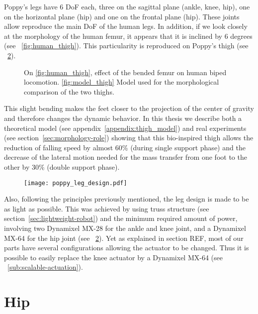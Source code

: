 Poppy's legs have 6 DoF each, three on the sagittal plane (ankle, knee, hip), one on the horizontal plane (hip) and one on the frontal plane (hip). These joints allow reproduce the main DoF of the human legs. In addition, if we look closely at the morphology of the human femur, it appears that it is inclined by 6 degrees (see \figurename~\ref{fig:human_thigh}). This particularity is reproduced on Poppy's thigh (see \figurename~\ref{fig:poppy_leg_design}).

\begin{figure}[tb]
\centering
    \hfil
    \caption{ On \ref{fig:human_thigh}, effect of the bended femur on human biped locomotion. \ref{fig:model_thigh} Model used for the morphological comparison of the two thighs.}
    \label{fig:poppy_thigh}
\end{figure}


This slight bending makes the feet closer to the projection of the center of gravity and therefore changes the dynamic behavior.
In this thesis we describe both a theoretical model (see appendix~\ref{appendix:thigh_model}) and real experiments (see section~\ref{sec:morphology-role}) showing that this bio-inspired thigh allows the reduction of falling speed by almost 60\% (during single support phase) and the decrease of the lateral motion needed for the mass transfer from one foot to the other by 30\% (double support phase).


\begin{figure}[p]
    \centering
        \texttt{[image: poppy\_leg\_design.pdf]}
    \caption{}
    \label{fig:poppy_leg_design}
\end{figure}


Also, following the principles previously mentioned, the leg design is made to be as light as possible. This was achieved by using truss structure (see section~\ref{sec:lightweight-robot}) and the minimum required amount of power, involving two Dynamixel MX-28 for the ankle and knee joint, and a Dynamixel MX-64 for the hip joint (see \figurename~\ref{fig:poppy_leg_design}). Yet as explained in section REF, most of our parts have several configurations allowing the actuator to be changed. Thus it is possible to easily replace the knee actuator by a Dynamixel MX-64 (see \figurename~\ref{sub:scalable-actuation}).


\section{Hip} %
\label{sec:hip}


